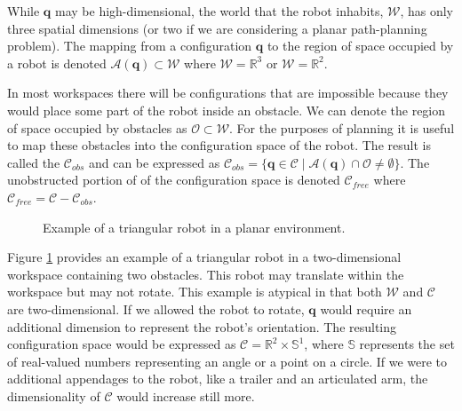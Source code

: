 While $\mathbf{q}$ may be high-dimensional, the world that the robot
inhabits, $\mathcal{W}$, has only three spatial dimensions (or two if
we are considering a planar path-planning problem). The mapping from a
configuration $\mathbf{q}$ to the region of space occupied by a robot is
denoted $\mathcal{A}(\mathbf{q}) \subset \mathcal{W}$ where
$\mathcal{W}=\mathbb{R}^3$ or $\mathcal{W}=\mathbb{R}^2$.


In most workspaces there will be configurations that are impossible
because they would place some part of the robot inside an obstacle. We
can denote the region of space occupied by obstacles as $\mathcal{O}
\subset \mathcal{W}$.  For the purposes of planning it is useful to
map these obstacles into the configuration space of the robot.  The
result is called the 
$\mathcal{C}_{obs}$ and can be expressed as $\mathcal{C}_{obs} =
\{\mathbf{q} \in \mathcal{C} \mid \mathcal{A}(\mathbf{q}) \cap
\mathcal{O} \neq \emptyset\}$.  The unobstructed portion of of the
configuration space is denoted $\mathcal{C}_{free}$ where
$\mathcal{C}_{free} = \mathcal{C} - \mathcal{C}_{obs}$.

\begin{figure}
\begin{center}
\end{center}
\caption{Example of a triangular robot in a planar environment.}
\label{fig:workspace}
\end{figure}

Figure \ref{fig:workspace} provides an example of a triangular robot
in a two-dimensional workspace containing two obstacles. This robot
may translate within the workspace but may not rotate.  This example is
atypical in that both $\mathcal{W}$ and $\mathcal{C}$ are
two-dimensional.  If we allowed the robot to rotate,
$\mathbf{\mathbf{q}}$ would require an additional dimension to
represent the robot's orientation.  The resulting configuration space
would be expressed as $\mathcal{C} = \mathbb{R}^2 \times
\mathbb{S}^1$, where $\mathbb{S}$ represents the set of real-valued
numbers representing an angle or a point on a circle.  If we were to
additional appendages to the robot, like a trailer and an articulated
arm, the dimensionality of $\mathcal{C}$ would increase still more.


